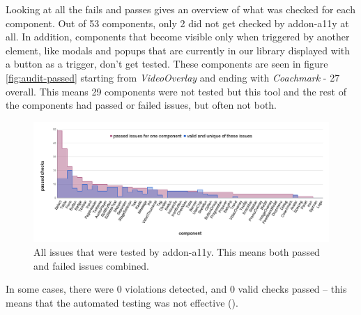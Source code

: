 \documentclass{master_thesis}
\begin{document}
Looking at all the fails and passes gives an overview of what was checked for each component. Out of 53 components, only 2 did not get checked by addon-a11y at all. In addition, components that become visible only when triggered by another element, like modals and popups that are currently in our library displayed with a button as a trigger, don't get tested. These components are seen in figure \ref{fig:audit-passed} starting from \textit{VideoOverlay} and ending with \textit{Coachmark} - 27 overall. This means 29 components were not tested but this tool and the rest of the components had passed or failed issues, but often not both.

\begin{figure}[H]
	\includegraphics[width=\textwidth]{img/audit-all.png}
	\caption{All issues that were tested by addon-a11y. This means both passed and failed issues combined.}
	\label{fig:audit-all}
\end{figure}

In some cases, there were 0 violations detected, and 0 valid checks passed – this means that the automated testing was not effective ().
\end{document}
